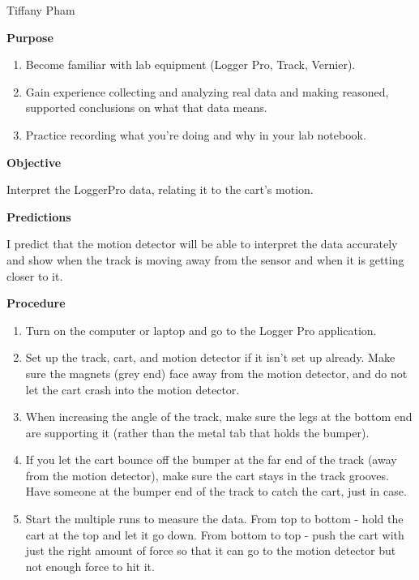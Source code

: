 \documentclass[idxtotoc,hyperref,openany]{labbook} %
\begin{document}

\vspace{-5mm}
Tiffany Pham

\textbf{Purpose}
\begin{enumerate}
    \item Become familiar with lab equipment (Logger Pro, Track, Vernier).
    \item Gain experience collecting and analyzing real data and making reasoned, supported conclusions on what that data means.
    \item Practice recording what you’re doing and why in your lab notebook.
\end{enumerate}

\hfill \break
\textbf{Objective}

Interpret the LoggerPro data, relating it to the cart's motion.

\hfill \break
\textbf{Predictions}

I predict that the motion detector will be able to interpret the data accurately and show when the track is moving away from the sensor and when it is getting closer to it.

\hfill \break
\textbf{Procedure}
\begin{enumerate}
    \item Turn on the computer or laptop and go to the Logger Pro application.
    \item Set up the track, cart, and motion detector if it isn't set up already. Make sure the magnets (grey end) face away from the motion detector, and do not let the cart crash into the motion detector.
    \item When increasing the angle of the track, make sure the legs at the bottom end are supporting it (rather than the metal tab that holds the bumper).
    \item If you let the cart bounce off the bumper at the far end of the track (away from the motion detector), make sure the cart stays in the track grooves. Have someone at the bumper end of the track to catch the cart, just in case.
    \item Start the multiple runs to measure the data. From top to bottom - hold the cart at the top and let it go down. From bottom to top - push the cart with just the right amount of force so that it can go to the motion detector but not enough force to hit it.
\end{enumerate}
\end{document}
